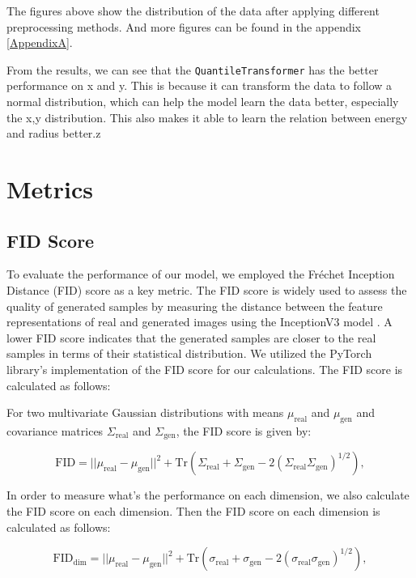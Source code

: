 The figures above show the distribution of the data after applying different preprocessing methods. And more figures can be found in the appendix \ref{AppendixA}. 

From the results, we can see that the \texttt{QuantileTransformer} has the better performance on x and y. This is because it can transform the data to follow a normal distribution, which can help the model learn the data better, especially the x,y distribution. This also makes it able to learn the relation between energy and radius better.z

\section{Metrics}
\subsection{FID Score}
To evaluate the performance of our model, we employed the Fréchet Inception Distance (FID) score as a key metric. The FID score is widely used to assess the quality of generated samples by measuring the distance between the feature representations of real and generated images using the InceptionV3 model \cite{inceptionv3}. A lower FID score indicates that the generated samples are closer to the real samples in terms of their statistical distribution. We utilized the PyTorch library's implementation of the FID score \cite{pytorch} for our calculations. The FID score is calculated as follows:

For two multivariate Gaussian distributions with means $\mu_{\text{real}}$ and $\mu_{\text{gen}}$ and covariance matrices $\Sigma_{\text{real}}$ and $\Sigma_{\text{gen}}$, the FID score is given by:

\begin{equation}
    \text{FID} = ||\mu_{\text{real}} - \mu_{\text{gen}}||^2 + \text{Tr}(\Sigma_{\text{real}} + \Sigma_{\text{gen}} - 2(\Sigma_{\text{real}}\Sigma_{\text{gen}})^{1/2}),
\end{equation}

In order to measure what's the performance on each dimension, we also calculate the FID score on each dimension. Then the FID score on each dimension is calculated as follows:

\begin{equation}
    \text{FID}_{\text{dim}} = ||\mu_{\text{real}} - \mu_{\text{gen}}||^2 + \text{Tr}(\sigma_{\text{real}} + \sigma_{\text{gen}} - 2(\sigma_{\text{real}}\sigma_{\text{gen}})^{1/2}),
\end{equation}

